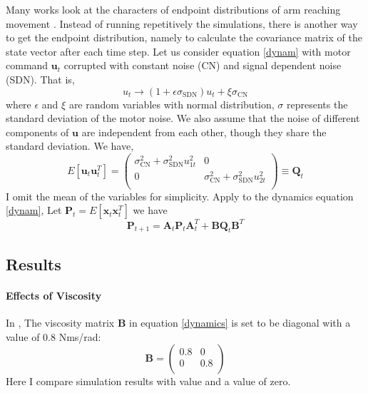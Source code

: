Many works look at the characters of endpoint distributions of arm reaching movement \cite{VanBeers2004, Guigon2008}. Instead of running repetitively the simulations, there is another way to get the endpoint distribution, namely to calculate the covariance matrix of the state vector after each time step. Let us consider equation \ref{dynam} with motor command $\bm{u}_t$ corrupted with constant noise (CN) and signal dependent noise (SDN). That is,
\begin{equation}
u_t \rightarrow (1 + \epsilon\sigma_{\text{SDN}}) u_t + \xi\sigma_{\text{CN}}
\end{equation}
where $\epsilon$ and $\xi$ are random variables with normal distribution, $\sigma$ represents the standard deviation of the motor noise. We also assume that the noise of different components of $\bm{u}$ are independent from each other, though they share the standard deviation. We have,
\begin{equation}
E[\bm{u}_t\bm{u}_t^T] = 
\left(\begin{matrix}
\sigma_{\text{CN}}^2 + 		\sigma_{\text{SDN}}^2 u_{1t}^2   &  0 \\
0  &   \sigma_{\text{CN}}^2 + 		\sigma_{\text{SDN}}^2 u_{2t}^2   \\
\end{matrix}\right)  \equiv \bm{Q}_t
\end{equation}
I omit the mean of the variables for simplicity. Apply to the dynamics equation \ref{dynam}, Let $\bm{P}_t = E[\bm{x}_{t}\bm{x}_{t}^T]$ we have
\begin{equation}
\bm{P}_{t+1} = \bm{A}_t \bm{P}_t\bm{A}_t^T + \bm{B}\bm{Q}_t\bm{B}^T
\end{equation}

\subsection{Results}\label{results}
\paragraph{Effects of Viscosity}
In \cite{VanBeers2004}, The viscosity matrix $\bm{B}$ in equation \ref{dynamics} is set to be diagonal with a value of 0.8 Nms/rad:
\begin{equation}
\bm{B} = 
\left(\begin{matrix}
0.8 & 0 \\
0 & 0.8 \\
\end{matrix}\right)
\end{equation}
Here I compare simulation results with \cite{VanBeers2004} value and a value of zero.

